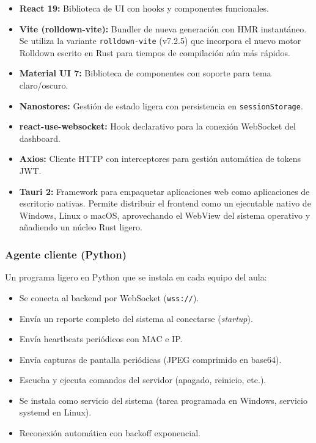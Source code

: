 \documentclass[12pt, a4paper, twoside]{article}
\begin{document}
\begin{itemize}
  \item \textbf{React 19:} Biblioteca de UI con hooks y componentes funcionales.
  \item \textbf{Vite (rolldown-vite):} Bundler de nueva generación con HMR instantáneo. Se utiliza la variante \texttt{rolldown-vite} (v7.2.5) que incorpora el nuevo motor Rolldown escrito en Rust para tiempos de compilación aún más rápidos.
  \item \textbf{Material UI 7:} Biblioteca de componentes con soporte para tema claro/oscuro.
  \item \textbf{Nanostores:} Gestión de estado ligera con persistencia en \texttt{sessionStorage}.
  \item \textbf{react-use-websocket:} Hook declarativo para la conexión WebSocket del dashboard.
  \item \textbf{Axios:} Cliente HTTP con interceptores para gestión automática de tokens JWT.
  \item \textbf{Tauri 2:} Framework para empaquetar aplicaciones web como aplicaciones de escritorio nativas. Permite distribuir el frontend como un ejecutable nativo de Windows, Linux o macOS, aprovechando el WebView del sistema operativo y añadiendo un núcleo Rust ligero.
\end{itemize}

\subsubsection{Agente cliente (Python)}

Un programa ligero en Python que se instala en cada equipo del aula:

\begin{itemize}
  \item Se conecta al backend por WebSocket (\texttt{wss://}).
  \item Envía un reporte completo del sistema al conectarse (\textit{startup}).
  \item Envía heartbeats periódicos con MAC e IP.
  \item Envía capturas de pantalla periódicas (JPEG comprimido en base64).
  \item Escucha y ejecuta comandos del servidor (apagado, reinicio, etc.).
  \item Se instala como servicio del sistema (tarea programada en Windows, servicio systemd en Linux).
  \item Reconexión automática con backoff exponencial.
\end{itemize}
\end{document}
